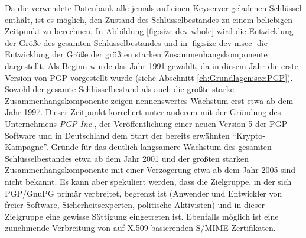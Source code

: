 Da die verwendete Datenbank alle jemals auf einen Keyserver geladenen
Schlüssel enthält, ist es möglich, den Zustand des Schlüsselbestandes
zu einem beliebigen Zeitpunkt zu berechnen. In Abbildung
\ref{fig:size-dev-whole} wird die Entwicklung der Größe des gesamten
Schlüsselbestandes und in \ref{fig:size-dev-mscc} die Entwicklung der
Größe der größten starken Zusammenhangskomponente dargestellt. Als
Beginn wurde das Jahr 1991 gewählt, da in diesem Jahr die erste
Version von PGP vorgestellt wurde (siehe Abschnitt
\ref{ch:Grundlagen:sec:PGP}). Sowohl der gesamte Schlüsselbestand als
auch die größte starke Zusammenhangskomponente zeigen nennenswertes
Wachstum erst etwa ab dem Jahr 1997. Dieser Zeitpunkt korreliert unter
anderem mit der Gründung des Unternehmens \emph{PGP Inc.}, der
Veröffentlichung einer neuen Version 5 der PGP-Software und in
Deutschland dem Start der bereits erwähnten
``Krypto-Kampagne''. Gründe für das deutlich langsamere Wachstum des
gesamten Schlüsselbestandes etwa ab dem Jahr 2001 und der größten
starken Zusammenhangskomponente mit einer Verzögerung etwa ab dem Jahr
2005 sind nicht bekannt. Es kann aber spekuliert werden, dass die
Zielgruppe, in der sich PGP/GnuPG prim\"ar verbreitet, begrenzt ist
(Anwender und Entwickler von freier Software, Sicherheitsexperten,
politische Aktivisten) und in dieser Zielgruppe eine gewisse
S\"attigung eingetreten ist. Ebenfalls m\"oglich ist eine zunehmende
Verbreitung von auf X.509 basierenden S/MIME-Zertifikaten.

